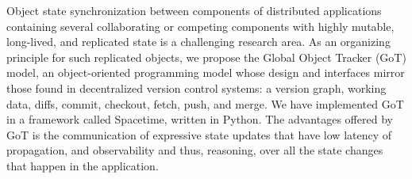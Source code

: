 \documentclass[a4paper,UKenglish]{dagrep-v2018}
\begin{document}
\license

Object state synchronization between components of distributed applications containing several collaborating or competing components with highly mutable, long-lived, and replicated state is a challenging research area. As an organizing principle for such replicated objects, we propose the Global Object Tracker (GoT) model, an object-oriented programming model whose design and interfaces mirror those found in decentralized version control systems: a version graph, working data, diffs, commit, checkout, fetch, push, and merge. We have implemented GoT in a framework called Spacetime, written in Python. The advantages offered by GoT is the communication of expressive state updates that have low latency of propagation, and observability and thus, reasoning, over all the state changes that happen in the application.






\end{document}
